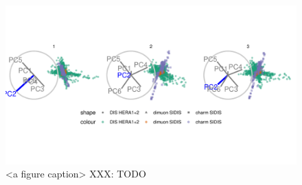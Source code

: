 \documentclass{monashthesis}
\begin{document}
\begin{figure}

{\centering \includegraphics[width=1\linewidth,]{./figures_from_script/ch3_fig7_DIS_worse_pc2} 

}

\caption{<a figure caption> XXX: TODO}\label{fig:ch3fig7}
\end{figure}

\printbibliography[heading=bibintoc]
\end{document}
